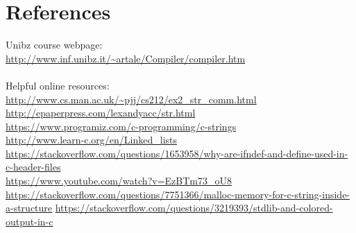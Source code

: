 \documentclass[12pt]{article}
\begin{document}
\section{References}
Unibz course webpage:\\
\url{http://www.inf.unibz.it/~artale/Compiler/compiler.htm}\\\\
Helpful online resources:\\
\url{http://www.cs.man.ac.uk/~pjj/cs212/ex2_str_comm.html}\\
\url{http://epaperpress.com/lexandyacc/str.html}\\
\url{https://www.programiz.com/c-programming/c-strings}\\
\url{http://www.learn-c.org/en/Linked_lists}\\
\url{https://stackoverflow.com/questions/1653958/why-are-ifndef-and-define-used-in-c-header-files}\\
\url{https://www.youtube.com/watch?v=EzBTm73_oU8}\\
\url{https://stackoverflow.com/questions/7751366/malloc-memory-for-c-string-inside-a-structure}
\url{https://stackoverflow.com/questions/3219393/stdlib-and-colored-output-in-c}




\end{document}
